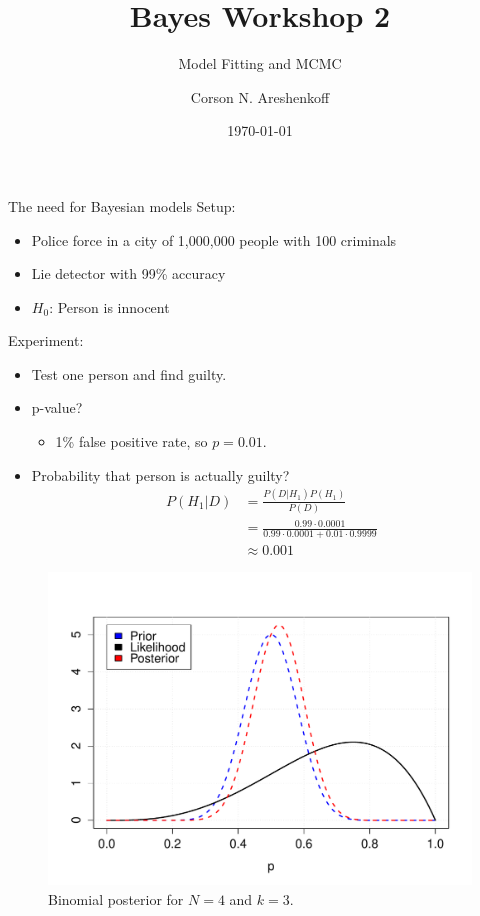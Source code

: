 \documentclass{beamer}
\title{Bayes Workshop 2}
\subtitle{Model Fitting and MCMC}
\date{\today}
\author{Corson N. Areshenkoff}
\institute{University of Victoria}
\begin{document}
\maketitle

\begin{frame}{The need for Bayesian models}
Setup:
	\begin{itemize}
		\item Police force in a city of 1,000,000 people with 100 criminals
		\item Lie detector with 99\% accuracy
		\item $H_0$: Person is innocent
	\end{itemize}
Experiment:
	\begin{itemize}
		\item Test one person and find guilty.
		\item p-value?
		\begin{itemize}
			\item 1\% false positive rate, so $p = 0.01$.
		\end{itemize}
		\item Probability that person is actually guilty?
		\begin{align*}
			P(H_1|D) &= \frac{P(D|H_1)P(H_1)}{P(D)} \\
					 &= \frac{0.99 \cdot 0.0001}
					   		 {0.99 \cdot 0.0001 + 0.01 \cdot 0.9999} \\
					 &\approx 0.001
		\end{align*}
	\end{itemize}
\end{frame}

\begin{frame}
    \begin{figure}
    \centering
        \includegraphics[width=.8\textwidth]{../images/binom_posterior.pdf}
        \caption{Binomial posterior for $N=4$ and $k=3$.}
    \end{figure}
\end{frame}
\end{document}
